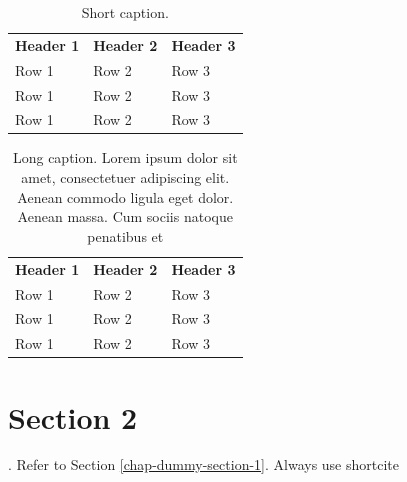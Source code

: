\begin{table}[!ht] \centering
	\caption{Short caption.}
	\begin{tabular}{|l|l|l|} \hline
		\textbf{Header 1} & \textbf{Header 2} & \textbf{Header 3} \\
		Row 1 & Row 2 & Row 3 \\ \hline
		Row 1 & Row 2 & Row 3 \\ \hline
		Row 1 & Row 2 & Row 3 \\ \hline
	\end{tabular}
	\label{table-sample-table}
\end{table}

\begin{table}[!ht] \centering
	\caption{Long caption. Lorem ipsum dolor sit amet, consectetuer adipiscing elit. Aenean commodo ligula eget dolor. Aenean massa. Cum sociis natoque penatibus et}
	\begin{tabular}{|l|l|l|} \hline
		\textbf{Header 1} & \textbf{Header 2} & \textbf{Header 3} \\
		Row 1 & Row 2 & Row 3 \\ \hline
		Row 1 & Row 2 & Row 3 \\ \hline
		Row 1 & Row 2 & Row 3 \\ \hline
	\end{tabular}
	\label{table-sample-table-2}
\end{table}

\section{Section 2}

\lipsum[1]. Refer to Section \ref{chap-dummy-section-1}. Always use shortcite 

